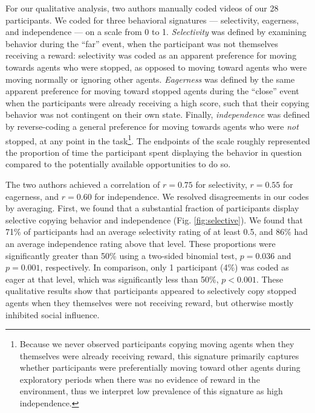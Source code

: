 \documentclass[12pt,letterpaper]{article}
\begin{document}
For our qualitative analysis, two authors manually coded videos of our 28 participants. We coded for three behavioral signatures --- selectivity, eagerness, and independence --- on a scale from 0 to 1. \emph{Selectivity} was defined by examining behavior during the ``far'' event, when the participant was not themselves receiving a reward: selectivity was coded as an apparent preference for moving towards agents who were stopped, as opposed to moving toward agents who were moving normally or ignoring other agents.
\emph{Eagerness} was defined by  the same apparent preference for moving toward stopped agents during the ``close'' event when the participants were already receiving a high score, such that their copying behavior was not contingent on their own state.
Finally, \emph{independence} was defined by reverse-coding a general preference for moving towards agents who were \emph{not} stopped, at any point in the task\footnote{Because we never observed participants copying moving agents when they themselves were already receiving reward, this signature primarily captures whether participants were preferentially moving toward other agents during exploratory periods when there was no evidence of reward in the environment, thus we interpret low prevalence of this signature as high independence.}. 
The endpoints of the scale roughly represented the proportion of time the participant spent displaying the behavior in question compared to the potentially available opportunities to do so. 

The two authors achieved a correlation of $r = 0.75$ for selectivity, $r = 0.55$ for eagerness, and $r = 0.60$ for independence. We resolved disagreements in our codes by averaging. 
First, we found that a substantial fraction of participants display selective copying behavior and independence (Fig. \ref{fig:selective}). 
We found that 71\% of participants had an average selectivity rating of at least 0.5, and 86\% had an average independence rating above that level. 
These proportions were significantly greater than 50\% using a two-sided binomial test, $p = 0.036$ and $p = 0.001$, respectively.  
In comparison, only 1 participant (4\%) was coded as eager at that level, which was significantly less than 50\%, $p < 0.001$.
These qualitative results show that participants appeared to selectively copy stopped agents when they themselves were not receiving reward, but otherwise mostly inhibited social influence.
\end{document}
